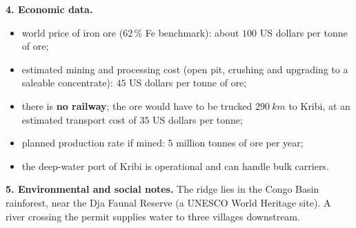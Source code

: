 \documentclass[11pt]{article}
\begin{document}
\textbf{4. Economic data.}
\begin{itemize}
\item world price of iron ore (62\,\% Fe benchmark): about $100$ US dollars per tonne of ore;
\item estimated mining and processing cost (open pit, crushing and upgrading to a saleable concentrate): $45$ US dollars per tonne of ore;
\item there is \textbf{no railway}; the ore would have to be trucked $\SI{290}{km}$ to Kribi, at an estimated transport cost of $35$ US dollars per tonne;
\item planned production rate if mined: $5$ million tonnes of ore per year;
\item the deep-water port of Kribi is operational and can handle bulk carriers.
\end{itemize}

\textbf{5. Environmental and social notes.} The ridge lies in the Congo Basin rainforest, near the Dja Faunal Reserve (a UNESCO World Heritage site). A river crossing the permit supplies water to three villages downstream.
\end{document}
